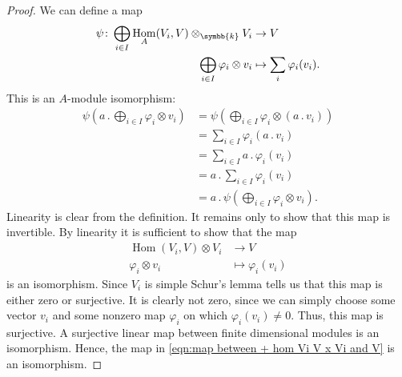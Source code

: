 \documentclass[fleqn]{NotesClass}
\renewcommand{\field}{\symbb{k}}
\DeclareMathOperator{\Hom}{Hom}
\newcommand{\action}{\mathbin{.}}
\begin{document}
\begin{lma}{}{}
\begin{proof}
            We can define a map
            \begin{equation}
                \label{eqn:map between + hom Vi V x Vi and V}
                \begin{aligned}
                    \psi \colon \bigoplus_{i \in I} \Hom_A(V_i, V) \otimes_{\field} V_i &\to V\\
                    \bigoplus_{i \in I} \varphi_i \otimes v_i &\mapsto \sum_i \varphi_i(v_i).
                \end{aligned}
            \end{equation}
            This is an \(A\)-module isomorphism:
            \begin{align}
                \psi\left( a \action {\textstyle \bigoplus_{i \in I}} \varphi_i \otimes v_i \right) &= \psi\left( {\textstyle \bigoplus_{i\in I}} \varphi_i \otimes (a \action v_i) \right)\\
                &= {\textstyle \sum_{i \in I}} \varphi_i(a \action v_i)\\
                &= {\textstyle \sum_{i \in I}} a \action \varphi_i(v_i)\\
                &= a \action {\textstyle \sum_{i \in I}} \varphi_i(v_i)\\
                &= a \action \psi\left( {\textstyle \bigoplus_{i \in I}} \varphi_i \otimes v_i \right).
            \end{align}
            Linearity is clear from the definition.
            It remains only to show that this map is invertible.
            By linearity it is sufficient to show that the map
            \begin{align}
                \Hom(V_i, V) \otimes V_i &\to V\\
                \varphi_i \otimes v_i &\mapsto \varphi_i(v_i)
            \end{align}
            is an isomorphism.
            Since \(V_i\) is simple Schur's lemma tells us that this map is either zero or surjective.
            It is clearly not zero, since we can simply choose some vector \(v_i\) and some nonzero map \(\varphi_i\) on which \(\varphi_i(v_i) \ne 0\).
            Thus, this map is surjective.
            A surjective linear map between finite dimensional modules is an isomorphism.
            Hence, the map in \cref{eqn:map between + hom Vi V x Vi and V} is an isomorphism.
            

\end{proof}
\end{lma}
\end{document}

